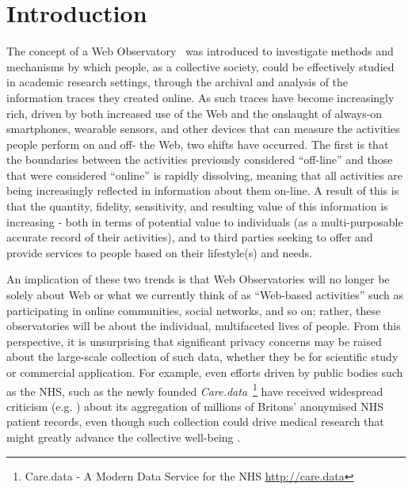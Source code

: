 \documentclass{acm_proc_article-sp}
\begin{document}


\maketitle
\begin{abstract}
\end{abstract}


\section{Introduction}

The concept of a Web Observatory~\cite{wobs} was introduced to investigate methods and mechanisms by which people, as a collective society, could be effectively studied in academic research settings, through the archival and analysis of the information traces they created online.  As such traces have become increasingly rich, driven by both increased use of the Web and the onslaught of always-on smartphones, wearable sensors, and other devices that can measure the activities people perform on and off- the Web, two shifts have occurred. The first is that the boundaries between the activities previously considered ``off-line'' and those that were considered ``online'' is rapidly dissolving, meaning that all activities are being increasingly reflected in information about them on-line. A result of this is that the quantity,  fidelity, sensitivity, and resulting value of this information is increasing - both in terms of potential value to individuals (as a multi-purposable accurate record of their activities), and to third parties seeking to offer and provide services to people based on their lifestyle(s) and needs. 

An implication of these two trends is that Web Observatories will no longer
be solely about Web or what we currently think of as ``Web-based activities''
such as participating in online communities, social networks, and so on; 
rather, these observatories will be about the individual, multifaceted lives 
of people.  From this perspective, it is unsurprising that significant privacy
concerns may be raised about the large-scale collection of such data, 
whether they be for scientific study or commercial application.  For example,
even efforts driven by public bodies such as the NHS, such as the newly founded \emph{Care.data}~\footnote{Care.data - A Modern Data Service for the NHS \url{http://care.data}} have received widespread criticism (e.g. \cite{RameshNHS}) about its aggregation of millions of Britons'
anonymised NHS patient records, even though such collection could drive
medical research that might greatly advance the collective well-being \cite{caredata}.
\end{document}
